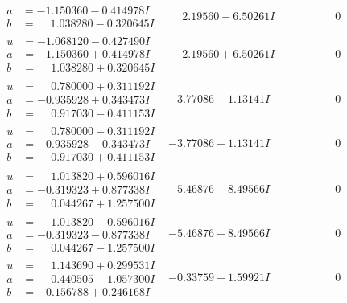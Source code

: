 \documentclass[1p]{elsarticle_modified}
\theoremstyle{definition}
\begin{document}
$$\begin{array}{c|c|c}
\begin{aligned}
a &= -1.150360 - 0.414978 I \\
b &= \phantom{-}1.038280 - 0.320645 I\end{aligned}
 & \phantom{-}2.19560 - 6.50261 I & \phantom{-0.000000 } 0 \\ \hline\begin{aligned}
u &= -1.068120 - 0.427490 I \\
a &= -1.150360 + 0.414978 I \\
b &= \phantom{-}1.038280 + 0.320645 I\end{aligned}
 & \phantom{-}2.19560 + 6.50261 I & \phantom{-0.000000 } 0 \\ \hline\begin{aligned}
u &= \phantom{-}0.780000 + 0.311192 I \\
a &= -0.935928 + 0.343473 I \\
b &= \phantom{-}0.917030 - 0.411153 I\end{aligned}
 & -3.77086 - 1.13141 I & \phantom{-0.000000 } 0 \\ \hline\begin{aligned}
u &= \phantom{-}0.780000 - 0.311192 I \\
a &= -0.935928 - 0.343473 I \\
b &= \phantom{-}0.917030 + 0.411153 I\end{aligned}
 & -3.77086 + 1.13141 I & \phantom{-0.000000 } 0 \\ \hline\begin{aligned}
u &= \phantom{-}1.013820 + 0.596016 I \\
a &= -0.319323 + 0.877338 I \\
b &= \phantom{-}0.044267 + 1.257500 I\end{aligned}
 & -5.46876 + 8.49566 I & \phantom{-0.000000 } 0 \\ \hline\begin{aligned}
u &= \phantom{-}1.013820 - 0.596016 I \\
a &= -0.319323 - 0.877338 I \\
b &= \phantom{-}0.044267 - 1.257500 I\end{aligned}
 & -5.46876 - 8.49566 I & \phantom{-0.000000 } 0 \\ \hline\begin{aligned}
u &= \phantom{-}1.143690 + 0.299531 I \\
a &= \phantom{-}0.440505 - 1.057300 I \\
b &= -0.156788 + 0.246168 I\end{aligned}
 & -0.33759 - 1.59921 I & \phantom{-0.000000 } 0 \\ \hline\begin{aligned}

\end{aligned}
\end{array}$$
\end{document}
